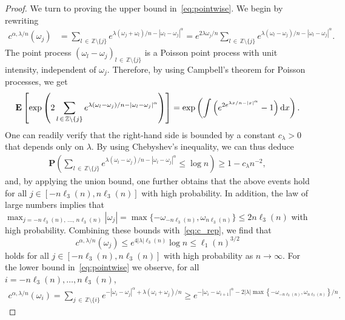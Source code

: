 \documentclass[AHL,Unicode,longabstracts,published]{cedram}
\newcommand{\Z}{\mathbb Z}
\newcommand{\bfP}{\mathbf{P}}
\newcommand{\bfE}{\mathbf{E}}
\newcommand{\dd}{\text{\upshape{d}}}
\begin{document}
\begin{proof}
We turn to proving the upper bound in~\eqref{eq:pointwise}. We begin by rewriting
\begin{align}\label{eq:c_rep}
c^{\alpha,\lambda/n}(\omega_j)&=\sum_{l\,\in\,\Z\setminus\{j\}}e^{\lambda\left(\omega_j+\omega_l\right)/n-\left|\omega_l-\omega_j\right|^\alpha}=e^{2\lambda\omega_j/n}\sum_{l\,\in\,\Z\setminus\{j\}}e^{\lambda\left(\omega_l-\omega_j\right)/n-\left|\omega_l-\omega_j\right|^\alpha}.
\end{align}
The point process $(\omega_l-\omega_j)_{l\,\in\,\Z\setminus\{j\}}$ is a Poisson point process with unit intensity, independent of $\omega_j$. Therefore, by using Campbell's theorem for Poisson processes, we get
\begin{align*}
\bfE\left[\exp\left(2\sum_{l\,\in\,\Z\setminus\{j\}}e^{\lambda(\omega_l-\omega_j)/n-\left|\omega_l-\omega_j\right|^\alpha}\right)\right] =\exp\left(\int \left(e^{2e^{\lambda x/n -|x|^\alpha}}-1\right) \dd x\right).
\end{align*}
One can readily verify that the right-hand side is bounded by a constant $c_\lambda>0$ that depends only on $\lambda$. By using Chebyshev's inequality, we can thus deduce
\begin{align*}
\bfP\left(\sum_{l\,\in\,\Z\setminus\{j\}}e^{\lambda\left(\omega_l-\omega_j\right)/n-\left|\omega_l-\omega_j\right|^\alpha} \le \log n\right)\ge 1-c_\lambda n^{-2},
\end{align*}
and, by applying the union bound, one further obtains that the above events hold for all $j\in[-n\ell_3(n),n\ell_3(n)]$ with high probability. In addition, the law of large numbers implies that $\max_{j=-n\ell_3(n),\,\dots,\,n\ell_3(n)}|\omega_j| = \max\{-\omega_{-n\ell_3(n)},\omega_{n\ell_3(n)}\}\leq 2n\ell_3(n)$ with high probability. Combining these bounds with~\eqref{eq:c_rep}, we find that
\begin{equation}\label{eq:mass3/2}
c^{\alpha,\lambda/n}(\omega_j)
\le e^{4|\lambda| \ell_3(n)}\log n \le \ell_1(n)^{3/2}
\end{equation}
holds for all $j\in[-n\ell_3(n),n\ell_3(n)]$ with high probability as $n\to\infty$. For the lower bound in~\eqref{eq:pointwise} we observe, for all $i=-n\ell_3(n),\dots,n\ell_3(n)$,
\begin{align*}
c^{\alpha,\lambda/n}(\omega_i)=\sum_{j\,\in\,\Z\setminus\{i\}} e^{-\left|\omega_i-\omega_j\right|^\alpha+\lambda\left(\omega_i+\omega_j\right)/n}\geq e^{-\left|\omega_i-\omega_{i+1}\right|^\alpha-2|\lambda|\max\left\{-\omega_{-n\ell_3(n)},\omega_{n\ell_3(n)}\right\}/n}.
\end{align*}

\end{proof}
\end{document}
